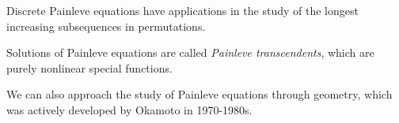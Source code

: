 \documentclass[11pt]{scrartcl}
\begin{document}
  \begin{note*}

    Discrete Painleve equations have applications in the study of the
    longest increasing subsequences in permutations. 

  \end{note*}

  Solutions of Painleve equations are called \textit{Painleve
    transcendents}, which are purely nonlinear special functions.

  We can also approach the study of Painleve equations through geometry,
  which was actively developed by Okamoto in 1970-1980s.

    
\end{document}
